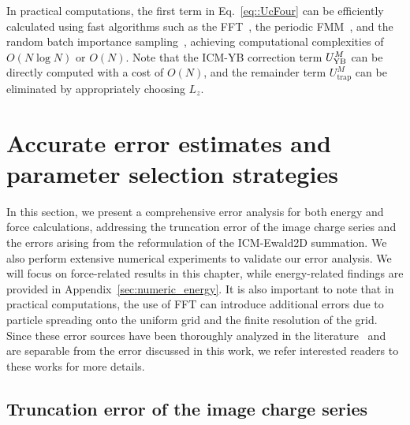 In practical computations, the first term in Eq.~\eqref{eq::UcFour} can be efficiently calculated using fast algorithms such as the FFT~\cite{yuan2021particle}, the periodic FMM~\cite{pei2023fast}, and the random batch importance sampling~\cite{liang2022improved}, achieving computational complexities of $O(N\log N)$ or $O(N)$. 
Note that the ICM-YB correction term $U_{\text{YB}}^{M}$ can be directly computed with a cost of $O(N)$, and the remainder term $U_{\text{trap}}^M$ can be eliminated by appropriately choosing $L_z$.

\section{Accurate error estimates and parameter selection strategies}

In this section, we present a comprehensive error analysis for both energy and force calculations, addressing the truncation error of the image charge series and the errors arising from the reformulation of the ICM-Ewald2D summation. 
We also perform extensive numerical experiments to validate our error analysis.
We will focus on force-related results in this chapter, while energy-related findings are provided in Appendix~\ref{sec:numeric_energy}.
It is also important to note that in practical computations, the use of FFT can introduce additional errors due to particle spreading onto the uniform grid and the finite resolution of the grid. 
Since these error sources have been thoroughly analyzed in the literature~\cite{deserno1998mesh,wang2012numerical,liang2023error,wang2016multiple,barnett2019parallel,barnett2021aliasing} and are separable from the error discussed in this work, we refer interested readers to these works for more details.

\subsection{Truncation error of the image charge series}\label{sec:error_image}

